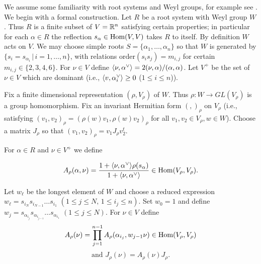 %
%
%

We assume some familiarity with root systems and Weyl groups, for example see 
\cite{humphreys_coxeter}.
We begin with a formal construction.  Let $R$ be a root system with
Weyl group $W$. Thus $R$ is a finite subset of $V={\mathbb R}^n$ satisfying
certain properties; in particular for each $\alpha\in R$
the reflection $s_\alpha\in \text{Hom}(V,V)$ takes $R$ to itself.  By
definition $W$ acts on $V$. We may choose simple roots
$S=\{\alpha_1,\dots, \alpha_n\}$ so that $W$ is generated by
$\{s_i=s_{\alpha_i}\,|\,i=1,\dots,n\}$, with relations
$\text{order}(s_is_j)=m_{i,j}$ for certain $m_{i,j}\in\{2,3,4,6\}$.
For $\nu\in V$ define $\langle\nu,\alpha^\vee\rangle=2(\nu,\alpha)/(\alpha,\alpha)$. 
Let $V^+$ be the set of $\nu\in V$ which are dominant (i.e.,
$\langle v,\alpha^\vee_i\rangle\ge0$ ($1\le i\le n$)).

Fix a finite dimensional representation $(\rho,V_\rho)$ of $W$.
Thus $\rho:W\rightarrow GL(V_\rho)$ is a group
homomorphism. Fix an invariant Hermitian form $(,)_\rho$ on
$V_\rho$ (i.e., satisfying
$(v_1,v_2)_\rho=(\rho(w)v_1,\rho(w)v_2)_\rho$ 
for all $v_1,v_2\in
V_\rho, w\in W$). 
Choose a matrix $J_\rho$ so that $(v_1,v_2)_\rho=v_1J_\rho v_2^t$.


For $\alpha\in R$ and  $\nu\in V^+$ we define 

\begin{equation}
\label{A}
A_\rho(\alpha,\nu)=\frac{1+\langle\nu,\alpha^\vee\rangle\rho(s_{\alpha})}{1+\langle\nu,\alpha^\vee\rangle}
\in\text{Hom}(V_\rho,V_\rho).
\end{equation}

Let $w_\ell$ be the longest element of $W$ and choose a reduced expression
$w_\ell=s_{i_N}s_{i_{N-1}}\dots s_{i_1}$
$(1\le j\le N,\,1\le i_j\le n)$.
Set $w_0=1$  and define
$w_j=s_{\alpha_{i_j}}s_{\alpha_{i_{j-1}}}\dots s_{\alpha_{i_1}}$
$(1\le j\le N)$.
For $\nu\in V$ define
\begin{equation}
A_\rho(\nu)=\prod_{j=1}^{n-1}A_\rho(\alpha_{i_j},w_{j-1}\nu)\in\text{Hom}(V_\rho,V_\rho)
\end{equation}
\begin{equation}
\mbox{and }
J_\rho(\nu)=A_\rho(\nu)J_\rho.
\end{equation}

